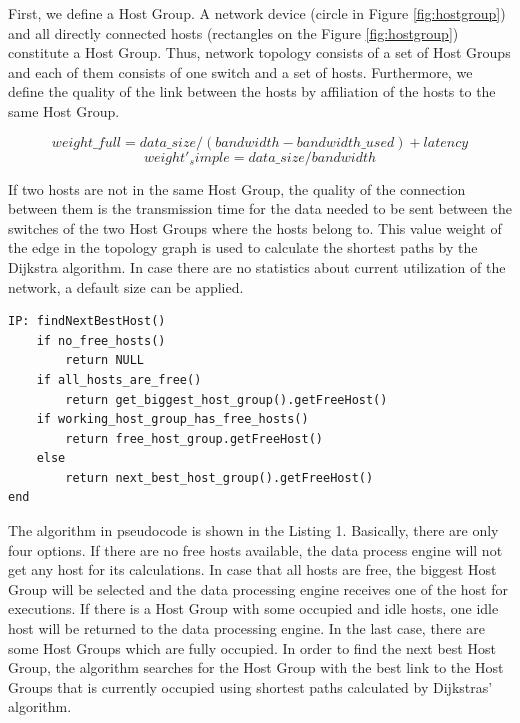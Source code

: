 First, we define a Host Group. A network device (circle in Figure \ref{fig:hostgroup}) and all
directly connected hosts (rectangles on the Figure \ref{fig:hostgroup}) constitute a Host Group.
Thus, network topology consists of a set of Host Groups and each of them consists of one switch and
a set of hosts. Furthermore, we define the quality of the link between the hosts by affiliation of
the hosts to the same Host Group.

\begin{equation}
    weight\_full = data\_size / (bandwidth - bandwidth\_used) + latency
\end{equation}
\begin{equation}
    weight'_simple = data\_size / bandwidth
\end{equation}

If two hosts are not in the same Host Group, the quality of the connection between them is the
transmission time for the data needed to be sent between the switches of the two Host Groups where
the hosts belong to. This value weight of the edge in the topology graph is used to calculate the
shortest paths by the Dijkstra algorithm. In case there are no statistics about current utilization
of the network, a default size can be applied.\\

\begin{lstlisting}[caption=Algorithm of finding free hosts based on Host Group concept]
IP: findNextBestHost()
    if no_free_hosts()
        return NULL
    if all_hosts_are_free()
        return get_biggest_host_group().getFreeHost()
    if working_host_group_has_free_hosts()
        return free_host_group.getFreeHost()
    else
        return next_best_host_group().getFreeHost()
end
\end{lstlisting}

The algorithm in pseudocode is shown in the Listing 1. Basically, there are only four options. If
there are no free hosts available, the data process engine will not get any host for its
calculations. In case that all hosts are free, the biggest Host Group will be selected and the data
processing engine receives one of the host for executions. If there is a Host Group with some
occupied and idle hosts, one idle host will be returned to the data processing engine. In the last
case, there are some Host Groups which are fully occupied. In order to find the next best Host
Group, the algorithm searches for the Host Group with the best link to the Host Groups that is
currently occupied using shortest paths calculated by Dijkstras’ algorithm.

